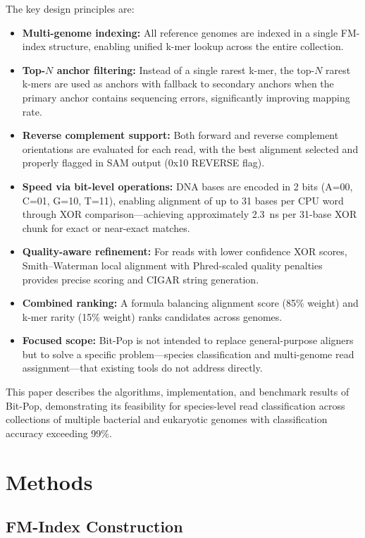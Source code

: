 \documentclass[10pt]{article}
\begin{document}
The key design principles are:
\begin{itemize}
    \item \textbf{Multi-genome indexing:} All reference genomes are indexed in a single FM-index structure, enabling unified k-mer lookup across the entire collection.
    \item \textbf{Top-$N$ anchor filtering:} Instead of a single rarest k-mer, the top-$N$ rarest k-mers are used as anchors with fallback to secondary anchors when the primary anchor contains sequencing errors, significantly improving mapping rate.
    \item \textbf{Reverse complement support:} Both forward and reverse complement orientations are evaluated for each read, with the best alignment selected and properly flagged in SAM output (0x10 REVERSE flag).
    \item \textbf{Speed via bit-level operations:} DNA bases are encoded in 2 bits (A=00, C=01, G=10, T=11), enabling alignment of up to 31 bases per CPU word through XOR comparison---achieving approximately 2.3~ns per 31-base XOR chunk for exact or near-exact matches.
    \item \textbf{Quality-aware refinement:} For reads with lower confidence XOR scores, Smith--Waterman local alignment with Phred-scaled quality penalties provides precise scoring and CIGAR string generation.
    \item \textbf{Combined ranking:} A formula balancing alignment score (85\% weight) and k-mer rarity (15\% weight) ranks candidates across genomes.
    \item \textbf{Focused scope:} Bit-Pop is not intended to replace general-purpose aligners but to solve a specific problem---species classification and multi-genome read assignment---that existing tools do not address directly.
\end{itemize}

This paper describes the algorithms, implementation, and benchmark results of Bit-Pop, demonstrating its feasibility for species-level read classification across collections of multiple bacterial and eukaryotic genomes with classification accuracy exceeding 99\%.

\section{Methods}

\subsection{FM-Index Construction}
\end{document}
